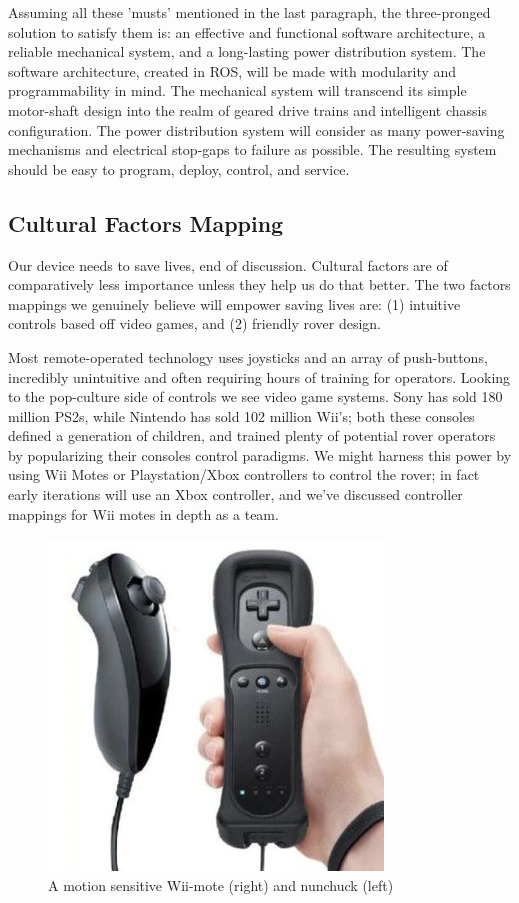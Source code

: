 \documentclass[a4paper, 10pt]{article}
\begin{document}
	Assuming all these 'musts' mentioned in the last paragraph, the three-pronged solution to satisfy them is: an effective and functional software architecture, a reliable mechanical system, and a long-lasting power distribution system. The software architecture, created in ROS, will be made with modularity and programmability in mind. The mechanical system will transcend its simple motor-shaft design into the realm of geared drive trains and intelligent chassis configuration. The power distribution system will consider as many power-saving mechanisms and electrical stop-gaps to failure as possible. The resulting system should be easy to program, deploy, control, and service.

	\subsection{Cultural Factors Mapping}
	Our device needs to save lives, end of discussion. Cultural factors are of comparatively less importance unless they help us do that better. The two factors mappings we genuinely believe will empower saving lives are: (1) intuitive controls based off video games, and (2) friendly rover design.
	
	Most remote-operated technology uses joysticks and an array of push-buttons, incredibly unintuitive and often requiring hours of training for operators. Looking to the pop-culture side of controls we see video game systems. Sony has sold 180 million PS2s, while Nintendo has sold 102 million Wii's; both these consoles defined a generation of children, and trained plenty of potential rover operators by popularizing their consoles control paradigms. We might harness this power by using Wii Motes or Playstation/Xbox controllers to control the rover; in fact early iterations will use an Xbox controller, and we've discussed controller mappings for Wii motes in depth as a team.
	
	\begin{figure} [!h]
			\centering
			\includegraphics[scale=0.75]{Photos/wii_mote}
			\caption{A motion sensitive Wii-mote (right) and nunchuck (left)}
			\label{wii_mote}
		\end{figure}
	
\end{document}
